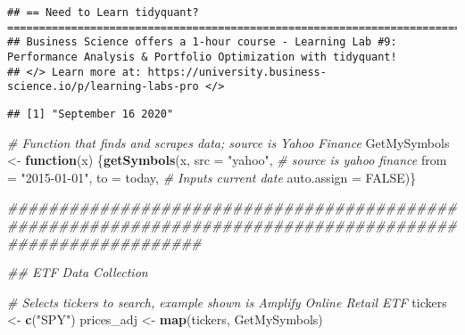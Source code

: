\documentclass[
]{article}
\newenvironment{Shaded}{\begin{snugshade}}{\end{snugshade}}
\newcommand{\CommentTok}[1]{\textcolor[rgb]{0.56,0.35,0.01}{\textit{#1}}}
\newcommand{\ControlFlowTok}[1]{\textcolor[rgb]{0.13,0.29,0.53}{\textbf{#1}}}
\newcommand{\DataTypeTok}[1]{\textcolor[rgb]{0.13,0.29,0.53}{#1}}
\newcommand{\KeywordTok}[1]{\textcolor[rgb]{0.13,0.29,0.53}{\textbf{#1}}}
\newcommand{\NormalTok}[1]{#1}
\newcommand{\OtherTok}[1]{\textcolor[rgb]{0.56,0.35,0.01}{#1}}
\newcommand{\StringTok}[1]{\textcolor[rgb]{0.31,0.60,0.02}{#1}}
\begin{document}
\begin{verbatim}
## == Need to Learn tidyquant? ======================================================================================================
## Business Science offers a 1-hour course - Learning Lab #9: Performance Analysis & Portfolio Optimization with tidyquant!
## </> Learn more at: https://university.business-science.io/p/learning-labs-pro </>
\end{verbatim}

\begin{Shaded}
\end{Shaded}

\begin{verbatim}
## [1] "September 16 2020"
\end{verbatim}

\begin{Shaded}
\begin{Highlighting}[]
  \CommentTok{# Function that finds and scrapes data; source is Yahoo Finance}
\NormalTok{    GetMySymbols <-}\StringTok{ }\ControlFlowTok{function}\NormalTok{(x) \{}\KeywordTok{getSymbols}\NormalTok{(x,}
                                            \DataTypeTok{src =} \StringTok{"yahoo"}\NormalTok{, }\CommentTok{# source is yahoo finance}
                                            \DataTypeTok{from =} \StringTok{"2015-01-01"}\NormalTok{,}
                                            \DataTypeTok{to =}\NormalTok{ today, }\CommentTok{# Inputs current date}
                                            \DataTypeTok{auto.assign =} \OtherTok{FALSE}\NormalTok{)\}}
    
\CommentTok{###########################################################################################################}
    
\CommentTok{## ETF Data Collection}
    
  \CommentTok{# Selects tickers to search, example shown is Amplify Online Retail ETF}
\NormalTok{    tickers <-}\StringTok{ }\KeywordTok{c}\NormalTok{(}\StringTok{"SPY"}\NormalTok{)}
\NormalTok{    prices_adj <-}\StringTok{ }\KeywordTok{map}\NormalTok{(tickers, GetMySymbols)}
\end{Highlighting}
\end{Shaded}
\end{document}

